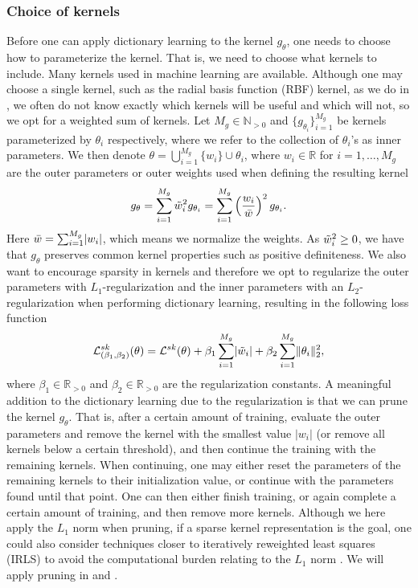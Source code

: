 \documentclass{article}
\begin{document}
\subsubsection{Choice of kernels}
Before one can apply dictionary learning to the kernel \(g_{\theta}\), one needs to choose how to parameterize the kernel. That is, we need to choose what kernels to include. Many kernels used in machine learning are available. Although one may choose a single kernel, such as the radial basis function (RBF) kernel, as we do in , we often do not know exactly which kernels will be useful and which will not, so we opt for a weighted sum of kernels. Let \(M_g \in \mathbb{N}_{>0}\) and \(\{g_{\theta_i}\}^{M_g}_{i=1}\) be kernels parameterized by \(\theta_i\) respectively, where we refer to the collection of \(\theta_i\)'s as inner parameters. We then denote \(\theta = \bigcup_{i=1}^{M_g}\{w_i\} \cup \theta_i\), where \(w_i \in \mathbb{R}\) for \(i=1,\dots, M_g\) are the outer parameters or outer weights used when defining the resulting kernel 
\begin{align}\label{eq:weight_sum}
    g_{\theta} =\sum_{i=1}^{M_g} \Tilde{w}_i^2 g_{\theta_i} = \sum_{i=1}^{M_g} \left(\frac{w_i}{\Bar{w}}\right)^2 g_{\theta_i}.
\end{align}
Here \(\Bar{w} = \sum_{i=1}^{M_g} \lvert w_i\rvert \), which means we normalize the weights. As \(\Tilde w_i^2 \geq 0\), we have that \(g_{\theta}\) preserves common kernel properties such as positive definiteness. We also want to encourage sparsity in kernels and therefore we opt to regularize the outer parameters with \(L_1\)-regularization and the inner parameters with an \(L_2\)-regularization when performing dictionary learning, resulting in the following loss function 
\begin{align*}
    \mathcal{L}^{sk}_{(\beta_1, \beta_2)}(\theta) = \mathcal{L}^{sk}(\theta) + \beta_1 \sum_{i=1}^{M_g} \lvert \Tilde w_i \rvert + \beta_2 \sum_{i=1}^{M_g} \lVert \theta_i \rVert^2_2,
\end{align*}
where \(\beta_1 \in \mathbb{R}_{>0}\) and \(\beta_2 \in \mathbb{R}_{>0}\) are the regularization constants. A meaningful addition to the dictionary learning due to the regularization is that we can prune the kernel \(g_{\theta}\). That is, after a certain amount of training, evaluate the outer parameters and remove the kernel with the smallest value \(\lvert w_i \rvert\) (or remove all kernels below a certain threshold), and then continue the training with the remaining kernels. When continuing, one may either reset the parameters of the remaining kernels to their initialization value, or continue with the parameters found until that point. One can then either finish training, or again complete a certain amount of training, and then remove more kernels. Although we here apply the \(L_1\) norm when pruning, if a sparse kernel representation is the goal, one could also consider techniques closer to iteratively reweighted least squares (IRLS) to avoid the computational burden relating to the \(L_1\) norm \citep{daubechies-2010, owhadi-2019b}. We will apply pruning in  and . 
\end{document}
